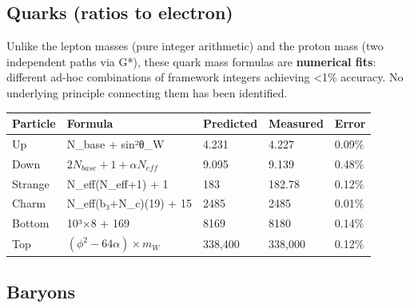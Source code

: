 \documentclass[
  11pt,
  letterpaper,
  twoside,
  openright]{book}
\begin{document}
\subsection{Quarks (ratios to
electron)}\label{quarks-ratios-to-electron}

\begin{tcolorbox}[enhanced jigsaw, coltitle=black, colbacktitle=quarto-callout-warning-color!10!white, toprule=.15mm, colframe=quarto-callout-warning-color-frame, arc=.35mm, opacityback=0, bottomtitle=1mm, toptitle=1mm, breakable, colback=white, titlerule=0mm, opacitybacktitle=0.6, title=\textcolor{quarto-callout-warning-color}{\faExclamationTriangle}\hspace{0.5em}{Epistemic Status: Numerical Fits}, rightrule=.15mm, bottomrule=.15mm, leftrule=.75mm, left=2mm]

Unlike the lepton masses (pure integer arithmetic) and the proton mass
(two independent paths via G*), these quark mass formulas are
\textbf{numerical fits}: different ad-hoc combinations of framework
integers achieving \textless1\% accuracy. No underlying principle
connecting them has been identified.

\end{tcolorbox}

\begin{longtable}[]{@{}lllll@{}}
\toprule\noalign{}
Particle & Formula & Predicted & Measured & Error \\
\midrule\noalign{}
\endhead
\bottomrule\noalign{}
\endlastfoot
Up & N\_base + sin²θ\_W & 4.231 & 4.227 & 0.09\% \\
Down & \(2N_{base} + 1 + \alpha N_{eff}\) & 9.095 & 9.139 & 0.48\% \\
Strange & N\_eff(N\_eff+1) + 1 & 183 & 182.78 & 0.12\% \\
Charm & N\_eff(b₃+N\_c)(19) + 15 & 2485 & 2485 & 0.01\% \\
Bottom & 10³×8 + 169 & 8169 & 8180 & 0.14\% \\
Top & \((\phi^2 - 64\alpha) \times m_W\) & 338,400 & 338,000 & 0.12\% \\
\end{longtable}

\subsection{Baryons}\label{baryons}
\end{document}
